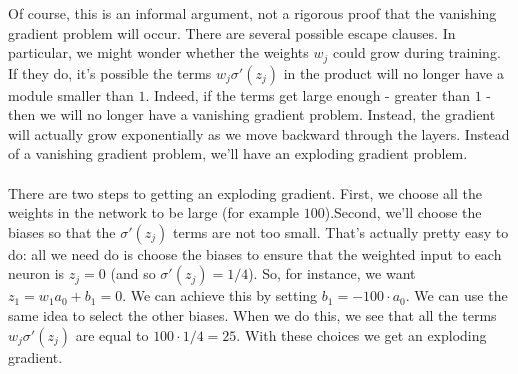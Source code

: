 {Of course, this is an informal argument, not a rigorous proof that the vanishing gradient problem will occur. There are several possible escape clauses. In particular, we might wonder whether the weights $w_j$ could grow during training. If they do, it's possible the terms $w_j\sigma'(z_j)$ in the product will no longer have a module smaller than $1$. Indeed, if the terms get large enough - greater than $1$ - then we will no longer have a vanishing gradient problem. Instead, the gradient will actually grow exponentially as we move backward through the layers. Instead of a vanishing gradient problem, we'll have an exploding gradient problem.

\paragraph{} There are two steps to getting an exploding gradient. First, we choose all the weights in the network to be large (for example $100$).Second, we'll choose the biases so that the $\sigma'(z_j)$ terms are not too small. That's actually pretty easy to do: all we need do is choose the biases to ensure that the weighted input to each neuron is $z_j=0$ (and so $\sigma'(z_j)=1/4$). So, for instance, we want $z_1=w_1a_0+b_1=0$. We can achieve this by setting $b_1=-100\cdot a_0$. We can use the same idea to select the other biases. When we do this, we see that all the terms $w_j\sigma'(z_j)$ are equal to $100\cdot 1/4=25$. With these choices we get an exploding gradient.

}
